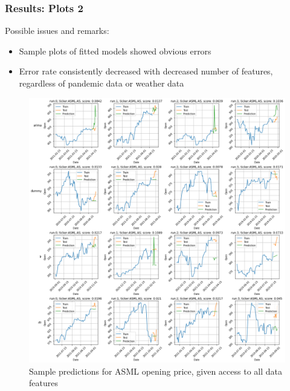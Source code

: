 \documentclass[aspectratio=169,classic]{uva-inf-presentation}
\begin{document}
\begin{frame}
\frametitle{Results: Plots 2}
Possible issues and remarks:
\begin{itemize}
    \item Sample plots of fitted models showed obvious errors
    \item Error rate consistently decreased with decreased number of features, regardless of pandemic data or weather data
\end{itemize}
\begin{figure}\centering
    \includegraphics[trim={0cm 20.1cm 9cm -6cm}, scale=0.25, clip]{images/sample_fits_asml.png}
    \caption{Sample predictions for ASML opening price, given access to all data features}
\end{figure}
\end{frame}

\onecolumn
\end{document}
